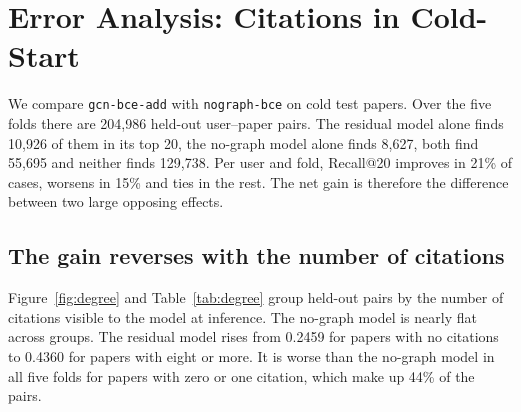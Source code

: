 \documentclass[10pt]{article}
\begin{document}
\begin{table}[t]
\centering\small
\caption{Paired test differences, with user-bootstrap 95\% intervals and the number of folds in which the first model is higher.}
\label{tab:paired}
\end{table}

\section{Error Analysis: Citations in Cold-Start}
We compare \texttt{gcn-bce-add} with \texttt{nograph-bce} on cold test papers. Over the five folds there are 204,986 held-out user--paper pairs. The residual model alone finds 10,926 of them in its top 20, the no-graph model alone finds 8,627, both find 55,695 and neither finds 129,738. Per user and fold, Recall@20 improves in 21\% of cases, worsens in 15\% and ties in the rest. The net gain is therefore the difference between two large opposing effects.

\subsection{The gain reverses with the number of citations}
Figure~\ref{fig:degree} and Table~\ref{tab:degree} group held-out pairs by the number of citations visible to the model at inference. The no-graph model is nearly flat across groups. The residual model rises from 0.2459 for papers with no citations to 0.4360 for papers with eight or more. It is worse than the no-graph model in all five folds for papers with zero or one citation, which make up 44\% of the pairs.
\end{document}
